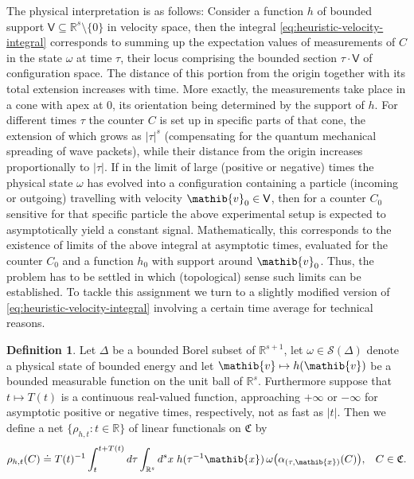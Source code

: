 \documentclass[a4paper,a4paper]{article}
\numberwithin{equation}{section}
\newcommand{\Rbb}{\mathbb{R}}
\newcommand{\Cfrak}{\mathfrak{C}}
\newcommand{\vib}{\mathib{v}}
\newcommand{\xib}{\mathib{x}}
\newcommand{\Sscr}{\mathscr{S}}
\newcommand{\Vsf}{\mathsf{V}}
\newcommand{\Rs}{\mathbb{R}^s}
\newcommand{\Rsone}{\mathbb{R}^{s + 1}}
\theoremstyle{definition}
\newtheorem{definition}{Definition}[section]
\theoremstyle{plain}
\theoremstyle{remark}
\newcommand{\set}[1]{\{ #1 \}}
\newcommand{\bset}[1]{\bigl\{ #1 \bigr\}}
\newcommand{\abs}[1]{\lvert #1 \rvert}
\begin{document}
  The physical interpretation is as follows: Consider a function $h$
  of bounded support $\Vsf \subseteq \Rs \setminus \set{0}$ in
  velocity space, then the integral
  \eqref{eq:heuristic-velocity-integral} corresponds to summing up the
  expectation values of measurements of $C$ in the state $\omega$ at
  time $\tau$, their locus comprising the bounded section $\tau \cdot
  \Vsf$ of configuration space. The distance of this portion from the
  origin together with its total extension increases with time. More
  exactly, the measurements take place in a cone with apex at $0$, its
  orientation being determined by the support of $h$. For different
  times $\tau$ the counter $C$ is set up in specific parts of that
  cone, the extension of which grows as $\abs{\tau}^{s}$ (compensating
  for the quantum mechanical spreading of wave packets), while their
  distance from the origin increases proportionally to $\abs{\tau}$.
  If in the limit of large (positive or negative) times the physical
  state $\omega$ has evolved into a configuration containing a
  particle (incoming or outgoing) travelling with velocity $\vib_0 \in
  \Vsf$, then for a counter $C_0$ sensitive for that specific
  particle the above experimental setup is expected to asymptotically
  yield a constant signal. Mathematically, this corresponds to the
  existence of limits of the above integral at asymptotic times,
  evaluated for the counter $C_0$ and a function $h_0$ with support
  around $\vib_0$.  Thus, the problem has to be settled in which
  (topological) sense such limits can be established. To tackle this
  assignment we turn to a slightly modified version of
  \eqref{eq:heuristic-velocity-integral} involving a certain time
  average for technical reasons.
  \begin{definition}
    \label{def:rho-definition}
    Let $\Delta$ be a bounded Borel subset of\/ $\Rsone$, let $\omega
    \in \Sscr ( \Delta )$ denote a physical state of bounded energy
    and let $\vib \mapsto h ( \vib )$ be a bounded measurable function
    on the unit ball of\/ $\Rs$. Furthermore suppose that $t \mapsto T
    ( t )$ is a continuous real-valued function, approaching $+
    \infty$ or $- \infty$ for asymptotic positive or negative times,
    respectively, not as fast as $\abs{t}$. Then we define a net
    $\bset{ \rho_{h , t} : t \in \Rbb}$ of linear functionals on
    $\Cfrak$ by
    \begin{equation}
      \label{eq:finite-times-functionals}
      \rho_{h , t} ( C ) \doteq T ( t )^{-1} \int_t^{t + T ( t )} d
      \tau \int_{\Rs} d^s x \; h ( \tau^{-1} \xib ) \, \omega \bigl(
      \alpha_{( \tau , \xib )} ( C ) \bigr) \text{,} \quad C \in
      \Cfrak \text{.}
    \end{equation}
  \end{definition}
  
\end{document}
